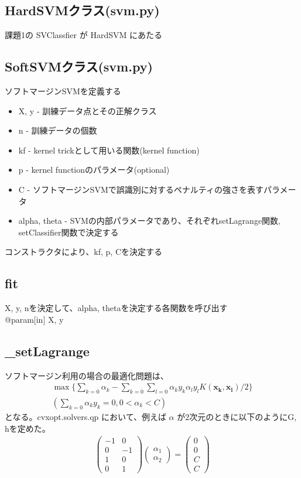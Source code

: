 \documentclass{jsarticle}
\begin{document}
\subsection*{HardSVMクラス(svm.py)}
課題1の SVClassfier が HardSVM にあたる
\subsection*{SoftSVMクラス(svm.py)}
ソフトマージンSVMを定義する
\begin{itemize}
    \item X, y - 訓練データ点とその正解クラス
    \item n - 訓練データの個数
    \item kf - kernel trickとして用いる関数(kernel function)
    \item p - kernel functionのパラメータ(optional)
    \item C - ソフトマージンSVMで誤識別に対するペナルティの強さを表すパラメータ
    \item alpha, theta - SVMの内部パラメータであり、それぞれsetLagrange関数, setClassifier関数で決定する
\end{itemize}
コンストラクタにより、kf, p, Cを決定する
\subsection*{fit}
X, y, nを決定して、alpha, thetaを決定する各関数を呼び出す \\
@param[in] X, y

\subsection{\_setLagrange}
ソフトマージン利用の場合の最適化問題は、
\begin{eqnarray}
\max \{\sum_{k=0} \alpha_k - \sum_{k=0} \sum_{l=0} \alpha_k y_k \alpha_l y_l K(\bm{x_k}, \bm{x_l}) / 2\} \\
(\sum_{k=0} \alpha_k y_k = 0, 0 < \alpha_k < C)
\end{eqnarray}
となる。cvxopt.solvers.qp において、例えば $\alpha$ が2次元のときに以下のようにG, hを定めた。
\begin{eqnarray}
    \left(
        \begin{array}{ccc}
          -1 & 0 \\
          0 & -1 \\
          1 & 0 \\
          0 & 1 
        \end{array}
      \right)
    \left(
        \begin{array}{ccc}
          \alpha_1 \\
          \alpha_2
        \end{array}
      \right)
    =
    \left(
        \begin{array}{ccc}
          0 \\
          0 \\
          C \\
          C
        \end{array}
      \right)
\end{eqnarray}
\end{document}
